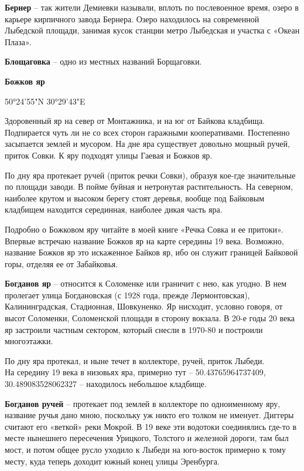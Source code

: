 \medskip


\textbf{Бернер} – так жители Демиевки называли, вплоть по послевоенное время, озеро в карьере кирпичного завода Бернера. Озеро находилось на современной Лыбедской площади, занимая кусок станции метро Лыбедская и участка с «Океан Плаза».\\ 

\medskip

\textbf{Блощаговка} – одно из местных названий Борщаговки.\\

\medskip

\textbf{Божков яр} 

50°24'55"N 30°29'43"E

Здоровенный яр на север от Монтажника, и на юг от Байкова кладбища. Подпирается чуть ли не со всех сторон гаражными кооперативами. Постепенно засыпается землей и мусором. На дне яра существует довольно мощный ручей, приток Совки. К яру подходят улицы Гаевая и Божков яр. 

По дну яра протекает ручей (приток речки Совки), образуя кое-где значительные по площади заводи. В пойме буйная и нетронутая растительность. На северном, наиболее крутом и высоком берегу стоят деревья, вообще под Байковым кладбищем находится серединная, наиболее дикая часть яра.

Подробно о Божковом яру читайте в моей книге «Речка Совка и ее притоки». Впервые встречаю название Божков яр на карте середины 19 века. Возможно, название Божков яр это искаженное Байков яр, ибо он служит границей Байковой горы, отделяя ее от Забайковья.\\

\medskip

\textbf{Богданов яр} – относится к Соломенке или граничит с нею, как угодно. В нем пролегает улица Богдановская (с 1928 года, прежде Лермонтовская), Калининградская, Стадионная, Шовкуненко. Яр нисходит, условно говоря, от высот Соломенки, Соломенской площади в сторону вокзала. В 20-е годы 20 века яр застроили частным сектором, который снесли в 1970-80 и построили многоэтажки.

По дну яра протекал, и ныне течет в коллекторе, ручей, приток Лыбеди.\\ 

На середину 19 века в низовьях яра, примерно тут – 50.43765964737409, 30.489083528062327 – находилось небольшое кладбище.
\medskip

\textbf{Богданов ручей} – протекает под землей в коллекторе по одноименному яру, название ручья дано мною, поскольку уж никто его толком не именует. Диггеры считают его «веткой» реки Мокрой. В 19 веке эти водотоки соединялись где-то в месте нынешнего пересечения Урицкого, Толстого и железной дороги, там был мост, и потом общее русло уходило к Лыбеди на юго-восток примерно к тому месту, куда теперь доходит южный конец улицы Эренбурга.

